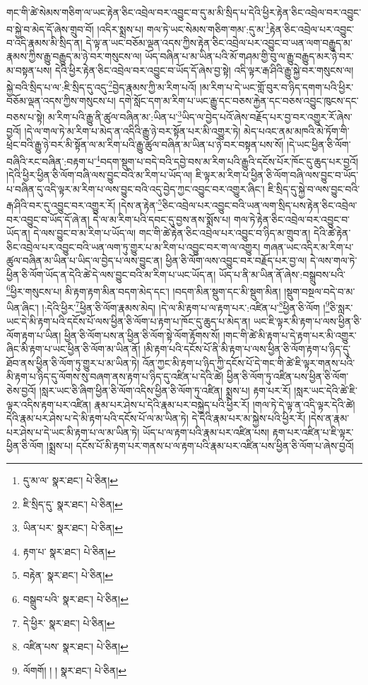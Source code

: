 གང་གི་ཚེ་སེམས་གཅིག་ལ་ཡང་རྟེན་ཅིང་འབྲེལ་བར་འབྱུང་བ་དུ་མ་མི་སྲིད་པ་དེའི་ཕྱིར་རྟེན་ཅིང་འབྲེལ་བར་འབྱུང་བ་སྐྱེ་བ་མེད་དོ་ཞེས་གྲུབ་བོ། །འདིར་སྨྲས་པ། གལ་ཏེ་ཡང་སེམས་གཅིག་གམ་:དུ་མ་\footnote{དུ་མ་ལ་  སྣར་ཐང་།  པེ་ཅིན། }རྟེན་ཅིང་འབྲེལ་པར་འབྱུང་བ་འདི་རྣམས་མི་སྲིད་ན། དེ་ལྟ་ན་ཡང་བཅོམ་ལྡན་འདས་ཀྱིས་རྟེན་ཅིང་འབྲེལ་པར་འབྱུང་བ་ཡན་ལག་བརྒྱུད་མ་རྣམས་ཀྱིས་རྒྱུ་བརྒྱུད་མ་ཉེ་བར་གསུངས་ལ། ཡོད་བཞིན་པ་མ་ཡིན་པའི་མོ་གཤམ་གྱི་བུ་ལ་རྒྱུ་བརྒྱུད་མར་ཉེ་བར་མ་བསྟན་པས། དེའི་ཕྱིར་རྟེན་ཅིང་འབྲེལ་བར་འབྱུང་བ་ཡོད་དོ་ཞེས་བྱ་སྟེ། འདི་ལྟར་རྒ་ཤིའི་རྒྱུ་སྐྱེ་བར་གསུངས་ལ། སྐྱེ་བའི་སྲིད་པ་ལ་:ཇི་སྲིད་དུ་འདུ་\footnote{ཇི་སྲིད་དུ་  སྣར་ཐང་།  པེ་ཅིན། }བྱེད་རྣམས་ཀྱི་མ་རིག་པའོ། །མ་རིག་པ་དེ་ཡང་གློ་བུར་བ་ཉིད་དགག་པའི་ཕྱིར་བཅོམ་ལྡན་འདས་ཀྱིས་གསུངས་པ། དགེ་སློང་དག་མ་རིག་པ་ཡང་རྒྱུ་དང་བཅས་རྐྱེན་དང་བཅས་འབྱུང་ཁུངས་དང་བཅས་པ་སྟེ། མ་རིག་པའི་རྒྱུ་ནི་ཚུལ་བཞིན་མ་:ཡིན་པ་\footnote{ཡིན་པར་  སྣར་ཐང་།  པེ་ཅིན། }ཡིད་ལ་བྱེད་པའོ་ཞེས་བརྗོད་པར་བྱ་བར་འགྱུར་རོ་ཞེས་བྱའོ། །དེ་ལ་གལ་ཏེ་མ་རིག་པ་མེད་ན་འདིའི་རྒྱུ་ཉེ་བར་སྟོན་པར་མི་འགྱུར་ཏེ། མེད་པའང་ནམ་མཁའི་མེ་ཏོག་གི་ཕྲེང་བའི་རྒྱུ་ཉེ་བར་མི་སྟོན་ལ་མ་རིག་པའི་རྒྱུ་ཚུལ་བཞིན་མ་ཡིན་པ་ཉེ་བར་བསྟན་པས་སོ། །དེ་ཡང་ཕྱིན་ཅི་ལོག་བཞིའི་རང་བཞིན་:བརྟག་པ་\footnote{རྟག་པ་  སྣར་ཐང་།  པེ་ཅིན། }བདག་སྡུག་པ་བདེ་བའི་དབྱེ་བས་མ་རིག་པའི་རྒྱུའི་དངོས་པོར་ཁོང་དུ་ཆུད་པར་བྱའོ། །དེའི་ཕྱིར་ཕྱིན་ཅི་ལོག་བཞི་ལས་བྱུང་བའི་མ་རིག་པ་ཡོད་ལ། ཇི་ལྟར་མ་རིག་པ་ཕྱིན་ཅི་ལོག་བཞི་ལས་བྱུང་བ་ཡོད་པ་བཞིན་དུ་འདི་ལྟར་མ་རིག་པ་ལས་བྱུང་བའི་འདུ་བྱེད་ཀྱང་འབྱུང་བར་འགྱུར་ཞིང་། ཇི་སྲིད་དུ་སྐྱེ་བ་ལས་བྱུང་བའི་རྒ་ཤིའི་བར་དུ་འབྱུང་བར་འགྱུར་རོ། །དེས་ན་རྟེན་\footnote{བརྟེན་  སྣར་ཐང་།  པེ་ཅིན། }ཅིང་འབྲེལ་པར་འབྱུང་བའི་ཡན་ལག་སྲིད་པས་རྟེན་ཅིང་འབྲེལ་བར་འབྱུང་བ་ཡོད་དོ་ཞེ་ན། དེ་ལ་མ་རིག་པའི་དབང་དུ་བྱས་ནས་སྨོས་པ། གལ་ཏེ་རྟེན་ཅིང་འབྲེལ་བར་འབྱུང་བ་ཡོད་ན། དེ་ལས་བྱུང་བ་མ་རིག་པ་ཡོད་ལ། གང་གི་ཚེ་རྟེན་ཅིང་འབྲེལ་པར་འབྱུང་བ་ཉིད་མ་གྲུབ་ན། དེའི་ཚེ་རྟེན་ཅིང་འབྲེལ་པར་འབྱུང་བའི་ཡན་ལག་ཏུ་གྱུར་པ་མ་རིག་པ་འབྱུང་བར་ག་ལ་འགྱུར། གཞན་ཡང་འདིར་མ་རིག་པ་ཚུལ་བཞིན་མ་ཡིན་པ་ཡིད་ལ་བྱེད་པ་ལས་བྱུང་ན། ཕྱིན་ཅི་ལོག་ལས་འབྱུང་བར་བརྗོད་པར་བྱ་ལ། དེ་ལས་གལ་ཏེ་ཕྱིན་ཅི་ལོག་ཡོད་ན་དེའི་ཚེ་དེ་ལས་བྱུང་བའི་མ་རིག་པ་ཡང་ཡོད་ན། ཡོད་པ་ནི་མ་ཡིན་ནོ་ཞེས་:བསྒྲུབས་པའི་\footnote{བསྒྲུབ་པའི་  སྣར་ཐང་།  པེ་ཅིན། }ཕྱིར་གསུངས་པ། མི་རྟག་རྟག་མིན་བདག་མེད་དང་། །བདག་མིན་སྡུག་དང་མི་སྡུག་མིན། །སྡུག་བསྔལ་བདེ་བ་མ་ཡིན་ཞིང་། །:དེའི་ཕྱིར་\footnote{དེ་ཕྱིར་  སྣར་ཐང་།  པེ་ཅིན། }ཕྱིན་ཅི་ལོག་རྣམས་མེད། །དེ་ལ་མི་རྟག་པ་ལ་རྟག་པར་:འཛིན་པ་\footnote{འཛིན་པས་  སྣར་ཐང་།  པེ་ཅིན། }ཕྱིན་ཅི་ལོག །\footnote{ལོགགོ། ། །  སྣར་ཐང་།  པེ་ཅིན། }ཅི་སླར་ཡང་དེ་མི་རྟག་པའི་དངོས་པོ་ལས་ཕྱིན་ཅི་ལོག་པ་རྟག་པ་ཁོང་དུ་ཆུད་པ་མེད་ན། ཡང་ཇི་ལྟར་མི་རྟག་པ་ལས་ཕྱིན་ཅི་ལོག་རྟག་པ་ཡིན། ཕྱིན་ཅི་ལོག་པས་ན་ཕྱིན་ཅི་ལོག་སྟེ་ལོག་རྟོགས་སོ། །གང་གི་ཚེ་མི་རྟག་པ་དེ་རྟག་པར་མི་འགྱུར་ཞིང་མི་རྟག་པ་ཡང་ཕྱིན་ཅི་ལོག་མ་ཡིན་ནོ། །མི་རྟག་པའི་དངོས་པོ་ནི་མི་རྟག་པ་ལས་ཕྱིན་ཅི་ལོག་རྟག་པ་ཉིད་དུ་ཐོབ་ནས་ཕྱིན་ཅི་ལོག་ཏུ་གྱུར་པ་མ་ཡིན་ཏེ། འོན་ཀྱང་མི་རྟག་པ་ཉིད་ཀྱི་དངོས་པོ་དེ་གང་གི་ཚེ་ཇི་ལྟར་གནས་པའི་མི་རྟག་པ་ཉིད་དུ་ལོགས་སུ་བཞག་ནས་རྟག་པ་ཉིད་དུ་འཛིན་པ་དེའི་ཚེ། ཕྱིན་ཅི་ལོག་ཏུ་འཛིན་པས་ཕྱིན་ཅི་ལོག་ཅེས་བྱའོ། །སླར་ཡང་ཅི་ཞིག་ཕྱིན་ཅི་ལོག་འདིས་ཕྱིན་ཅི་ལོག་ཏུ་འཛིན། སྨྲས་པ། རྟག་པར་རོ། །སླར་ཡང་དེའི་ཚེ་ཇི་ལྟར་འདིས་རྟག་པར་འཛིན། རྣམ་པར་ཤེས་པ་དེའི་རྣམ་པར་བསྐྱེད་པའི་ཕྱིར་རོ། །གལ་ཏེ་དེ་ལྟ་ན་འདི་ལྟར་དེའི་ཚེ། དེའི་རྣམ་པར་ཤེས་པ་དེ་མི་རྟག་པའི་དངོས་པོ་ལ་མ་ཡིན་ཏེ། དེ་དེའི་རྣམ་པར་མ་སྐྱེས་པའི་ཕྱིར་རོ། །དེས་ན་རྣམ་པར་ཤེས་པ་དེ་ཡང་མི་རྟག་པ་ལ་མ་ཡིན་ཏེ། ཡོད་པ་ལ་རྟག་པའི་རྣམ་པར་འཛིན་པས། རྟག་པར་འཛིན་པ་ཇི་ལྟར་ཕྱིན་ཅི་ལོག །སྨྲས་པ། དངོས་པོ་མི་རྟག་པར་གནས་པ་ལ་རྟག་པའི་རྣམ་པར་འཛིན་པས་ཕྱིན་ཅི་ལོག་པ་ཞེས་བྱའོ། 